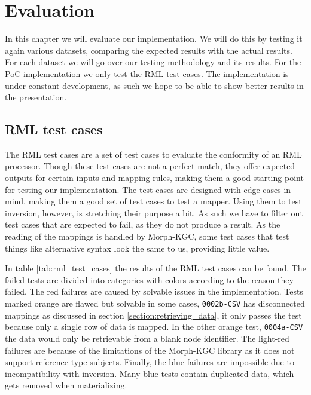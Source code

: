 \chapter{Evaluation}
\label{chapter:evaluation}
In this chapter we will evaluate our implementation. We will do this by testing it again various datasets, comparing the expected results with the actual results. For each dataset we will go over our testing methodology and its results. For the PoC implementation we only test the RML test cases. The implementation is under constant development, as such we hope to be able to show better results in the presentation.

\section{RML test cases}
\label{section:rml_test_cases}
The RML test cases \citep{rml-test-cases} are a set of test cases to evaluate the conformity of an RML processor. Though these test cases are not a perfect match, they offer expected outputs for certain inputs and mapping rules, making them a good starting point for testing our implementation. The test cases are designed with edge cases in mind, making them a good set of test cases to test a mapper. Using them to test inversion, however, is stretching their purpose a bit. As such we have to filter out test cases that are expected to fail, as they do not produce a result. As the reading of the mappings is handled by Morph-KGC, some test cases that test things like alternative syntax look the same to us, providing little value.

In table \ref{tab:rml_test_cases} the results of the RML test cases can be found. The failed tests are divided into categories with colors according to the reason they failed. The red failures are caused by solvable issues in the implementation. Tests marked orange are flawed but solvable in some cases, \texttt{0002b-CSV} has disconnected mappings as discussed in section \ref{section:retrieving_data}, it only passes the test because only a single row of data is mapped. In the other orange test, \texttt{0004a-CSV} the data would only be retrievable from a blank node identifier. The light-red failures are because of the limitations of the Morph-KGC library as it does not support reference-type subjects. Finally, the blue failures are impossible due to incompatibility with inversion. Many blue tests contain duplicated data, which gets removed when materializing.

